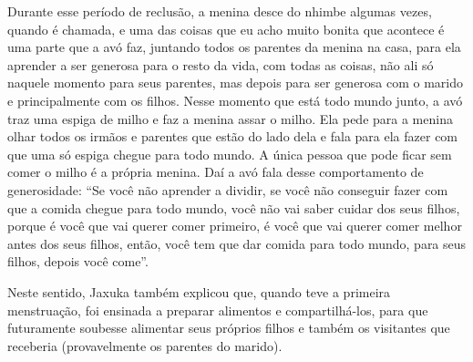 \documentclass{article}
\begin{document}
Durante esse per\'iodo de reclus\~ao, a menina desce do nhimbe algumas
vezes, quando \'e chamada, e uma das coisas que eu acho muito bonita
que acontece \'e uma parte que a av\'o faz, juntando todos os parentes
da menina na casa, para ela aprender a ser generosa para o resto da
vida, com todas as coisas, n\~ao ali s\'o naquele momento para seus
parentes, mas depois para ser generosa com o marido e principalmente
com os filhos. Nesse momento que est\'a todo mundo junto, a av\'o traz
uma espiga de milho e faz a menina assar o milho. Ela pede para a
menina olhar todos os irm\~aos e parentes que est\~ao do lado dela e
fala para ela fazer com que uma s\'o espiga chegue para todo mundo. A
\'unica pessoa que pode ficar sem comer o milho \'e a pr\'opria menina.
Da\'i a av\'o fala desse comportamento de generosidade:
{\textquotedblleft}Se voc\^e n\~ao aprender a dividir, se voc\^e n\~ao
conseguir fazer com que a comida chegue para todo mundo, voc\^e n\~ao
vai saber cuidar dos seus filhos, porque \'e voc\^e que vai querer
comer primeiro, \'e voc\^e que vai querer comer melhor antes dos seus
filhos, ent\~ao, voc\^e tem que dar comida para todo mundo, para seus
filhos, depois voc\^e come{\textquotedblright}. 

Neste sentido, Jaxuka tamb\'em explicou que, quando teve a primeira
menstrua\c{c}\~ao, foi ensinada a preparar alimentos e
compartilh\'a-los, para que futuramente soubesse alimentar seus
pr\'oprios filhos e tamb\'em os visitantes que receberia (provavelmente
os parentes do marido).
\end{document}
